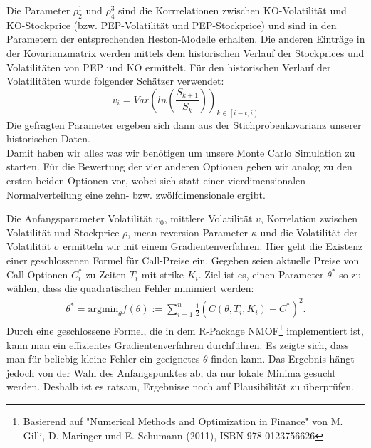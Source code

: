 \documentclass[12pt]{article}
\begin{document}
Die Parameter $\rho^1_2$ und $\rho^3_4$ sind die Korrrelationen zwischen KO-Volatilität und KO-Stockprice (bzw. PEP-Volatilität und PEP-Stockprice) und sind in den Parametern der entsprechenden Heston-Modelle erhalten. Die anderen Einträge in der Kovarianzmatrix werden mittels dem historischen Verlauf der Stockprices und Volatilitäten von PEP und KO ermittelt. 
Für den historischen Verlauf der Volatilitäten wurde folgender Schätzer verwendet:
\begin{equation*}
v_i=Var(ln(\frac{S_{k+1}}{S_k}))_{k\in\left[i-t,i\right)}
\end{equation*}
Die gefragten Parameter ergeben sich dann aus der Stichprobenkovarianz unserer historischen Daten.\\









Damit haben wir alles was wir benötigen um unsere Monte Carlo Simulation zu starten.
Für die Bewertung der vier anderen Optionen gehen wir analog zu den ersten beiden Optionen vor, wobei sich statt einer vierdimensionalen Normalverteilung eine zehn- bzw. zwölfdimensionale ergibt.




Die Anfangsparameter Volatilität $v_0$, mittlere Volatilität $\bar{v}$, Korrelation zwischen Volatilität und Stockprice $\rho$, mean-reversion Parameter $\kappa$ und die Volatilität der Volatilität $\sigma$ ermitteln wir mit einem Gradientenverfahren. Hier geht die Existenz einer geschlossenen Formel für Call-Preise ein. Gegeben seien aktuelle Preise von Call-Optionen $C_i^*$ zu Zeiten $T_i$ mit strike $K_i$. Ziel ist es, einen Parameter $\theta^*$ so zu wählen, dass die quadratischen Fehler minimiert werden:
\begin{gather*}
\theta^*=\text{argmin}_{\theta} f(\theta):=\sum_{i=1}^n \frac12 (C(\theta,T_i,K_i)-C^*)^2.
\end{gather*}
Durch eine geschlossene Formel, die in dem R-Package \glqq NMOF\grqq\footnote{Basierend auf "Numerical Methods and Optimization in Finance" von M. Gilli, D. Maringer und E. Schumann (2011), ISBN 978-0123756626} implementiert ist, kann man ein effizientes Gradientenverfahren durchführen. Es zeigte sich, dass man für beliebig kleine Fehler ein geeignetes $\theta$ finden kann. Das Ergebnis hängt jedoch von der Wahl des Anfangspunktes ab, da nur lokale Minima gesucht werden. Deshalb ist es ratsam, Ergebnisse noch auf Plausibilität zu überprüfen.
\end{document}

